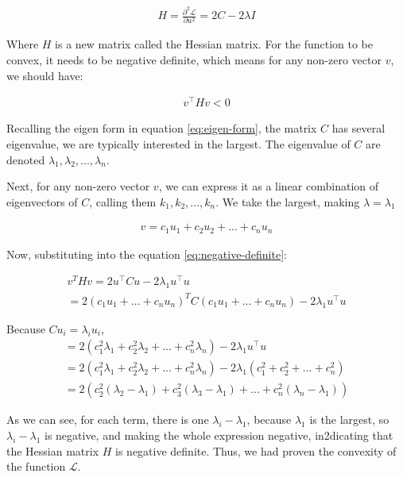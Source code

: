 \documentclass[stu,12pt,floatsintext]{apa7}
\begin{document}
\begin{gather}
    H=\frac{\partial^2 \mathcal{L}}{\partial u^2} = 2C - 2\lambda I
\end{gather}

Where $H$ is a new matrix called the Hessian matrix. For the function to be convex, it needs to be negative definite, which means for any non-zero vector $v$, we should have:

\begin{gather}
    \label{eq:negative-definite}
    v^\top Hv<0
\end{gather}

Recalling the eigen form in equation \ref{eq:eigen-form}, the matrix $C$ has several eigenvalue, we are typically interested in the largest. The eigenvalue of $C$ are denoted $\lambda_1, \lambda_2, ...,\lambda_n$.

Next, for any non-zero vector $v$, we can express it as a linear combination of eigenvectors of $C$, calling them $k_1,k_2,...,k_n$. We take the largest, making $\lambda=\lambda_1$

\begin{gather}
    v=c_1u_1+c_2u_2+...+c_nu_n
\end{gather}

Now, substituting into the equation \ref{eq:negative-definite}:

\begin{gather}
v^T H v = 2u^\top Cu-2\lambda_1 u^\top u\\
=2(c_1u_1 + ... + c_nu_n)^T C (c_1u_1 + ... + c_nu_n)-2\lambda_1u^\top u
\end{gather}

Because $Cu_i=\lambda_i u_i$,
\begin{gather}
    =2(c_1^2\lambda_1 + c_2^2\lambda_2 + ... + c_n^2\lambda_n)-2\lambda_1u^\top u\\
    =2(c_1^2\lambda_1 + c_2^2\lambda_2 + ... + c_n^2\lambda_n)-2\lambda_1(c_1^2 + c_2^2 + ... + c_n^2)\\
    =2(c_2^2(\lambda_2 - \lambda_1) + c_3^2(\lambda_3 - \lambda_1) + ... + c_n^2(\lambda_n - \lambda_1))
\end{gather}

As we can see, for each term, there is one $\lambda_i -\lambda_1$, because $\lambda_1$ is the largest, so $\lambda_i-\lambda_1$ is negative, and making the whole expression negative, in2dicating that the Hessian matrix $H$ is negative definite. Thus, we had proven the convexity of the function $\mathcal{L}$.
\end{document}
